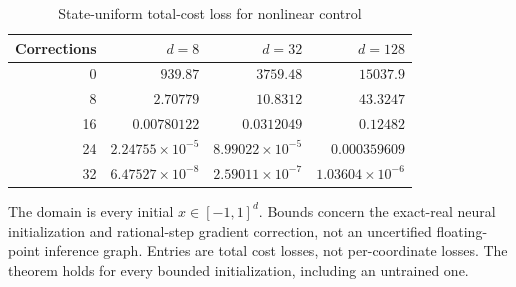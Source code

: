 \begin{table}[t]
\centering\small
\caption{State-uniform total-cost loss for nonlinear control}\label{tab:r18nonlinearuniform}
\begin{tabular}{rrrr}
\toprule
Corrections & $d=8$ & $d=32$ & $d=128$\\
\midrule
0 & $939.87$ & $3759.48$ & $15037.9$\\
8 & $2.70779$ & $10.8312$ & $43.3247$\\
16 & $0.00780122$ & $0.0312049$ & $0.12482$\\
24 & $2.24755\times10^{-5}$ & $8.99022\times10^{-5}$ & $0.000359609$\\
32 & $6.47527\times10^{-8}$ & $2.59011\times10^{-7}$ & $1.03604\times10^{-6}$\\
\bottomrule
\end{tabular}
\par\smallskip\begin{minipage}{.98\linewidth}\footnotesize The domain is every initial $x\in[-1,1]^d$. Bounds concern the exact-real neural initialization and rational-step gradient correction, not an uncertified floating-point inference graph. Entries are total cost losses, not per-coordinate losses. The theorem holds for every bounded initialization, including an untrained one.\end{minipage}
\end{table}
